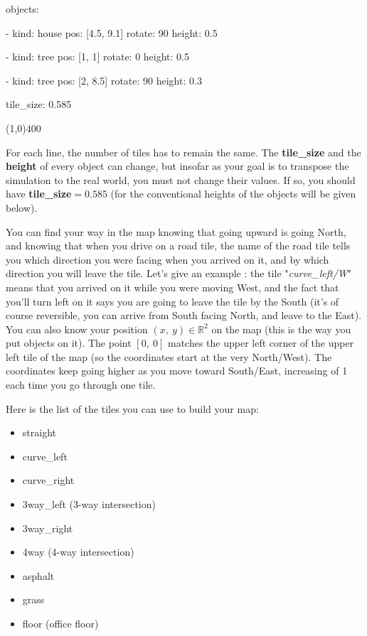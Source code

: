 \noindent objects:

\noindent- kind: house\newline
  pos: [4.5, 9.1]\newline
  rotate: 90\newline
  height: 0.5

\noindent- kind: tree\newline
  pos: [1, 1]\newline
  rotate: 0\newline
  height: 0.5

\noindent- kind: tree\newline
  pos: [2, 8.5]\newline
  rotate: 90\newline
  height: 0.3

\noindent tile\_size: 0.585
\begin{center}
    \line(1,0){400}
\end{center}

For each line, the number of tiles has to remain the same.
The \textbf{tile\_size} and the \textbf{height} of every object can change, but insofar as your goal is to transpose the simulation to the real world, you must not change their values.
If so, you should have \textbf{tile\_size}$=0.585$ (for the conventional heights of the objects will be given below).

You can find your way in the map knowing that going upward is going North, and knowing that when you drive on a road tile, the name of the road tile tells you which direction you were facing when you arrived on it, and by which direction you will leave the tile.
Let's give an example : the tile "\textit{curve\_left/W}" means that you arrived on it while you were moving West, and the fact that you'll turn left on it says you are going to leave the tile by the South (it's of course reversible, you can arrive from South facing North, and leave to the East).
You can also know your position $(x,\ y)\in\mathbb{R}^2$ on the map (this is the way you put objects on it).
The point $[0,\ 0]$ matches the upper left corner of the upper left tile of the map (so the coordinates start at the very North/West).
The coordinates keep going higher as you move toward South/East, increasing of 1 each time you go through one tile.

Here is the list of the tiles you can use to build your map:
\begin{itemize}
    \item straight
    \item curve\_left
    \item curve\_right
    \item 3way\_left (3-way intersection)
    \item 3way\_right
    \item 4way (4-way intersection)
    \item asphalt
    \item grass
    \item floor (office floor)
\end{itemize}

